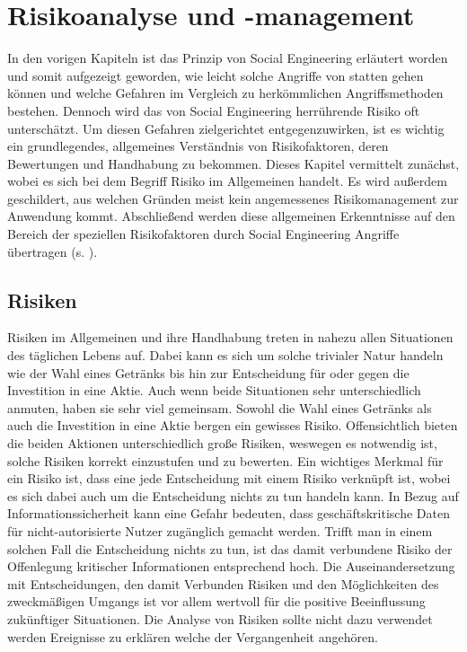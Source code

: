 \section{Risikoanalyse und -management}\label{sec:risikoanalyse}
In den vorigen Kapiteln ist das Prinzip von Social Engineering erläutert worden und somit aufgezeigt
geworden, wie leicht solche Angriffe von statten gehen können und welche Gefahren im Vergleich zu
herkömmlichen Angriffsmethoden bestehen.
Dennoch wird das von Social Engineering herrührende Risiko oft unterschätzt.
Um diesen Gefahren zielgerichtet entgegenzuwirken, ist es wichtig ein grundlegendes, allgemeines
Verständnis von Risikofaktoren, deren Bewertungen und Handhabung zu bekommen.
Dieses Kapitel vermittelt zunächst, wobei es sich bei dem Begriff Risiko im Allgemeinen handelt.
Es wird außerdem geschildert, aus welchen Gründen meist kein angemessenes Risikomanagement
zur Anwendung kommt.
Abschließend werden diese allgemeinen Erkenntnisse auf den Bereich der speziellen Risikofaktoren durch
Social Engineering Angriffe übertragen (s. ).

\subsection{Risiken}\label{sec:allgemeines}
Risiken im Allgemeinen und ihre Handhabung treten in nahezu allen Situationen des täglichen Lebens
auf.
Dabei kann es sich um solche trivialer Natur handeln wie der Wahl eines Getränks bis hin
zur Entscheidung für oder gegen die Investition in eine Aktie.
Auch wenn beide Situationen sehr unterschiedlich anmuten, haben sie sehr viel gemeinsam.
Sowohl die Wahl eines Getränks als auch die Investition in eine Aktie bergen ein gewisses Risiko.
Offensichtlich bieten die beiden Aktionen unterschiedlich große Risiken, weswegen es notwendig ist,
solche Risiken korrekt einzustufen und zu bewerten.
Ein wichtiges Merkmal für ein Risiko ist, dass eine jede Entscheidung mit einem Risiko verknüpft ist,
wobei es sich dabei auch um die Entscheidung nichts zu tun handeln kann.
In Bezug auf Informationssicherheit kann eine Gefahr bedeuten, dass geschäftskritische Daten für
nicht-autorisierte Nutzer zugänglich gemacht werden.
Trifft man in einem solchen Fall die Entscheidung nichts zu tun, ist das damit verbundene Risiko der Offenlegung kritischer Informationen entsprechend hoch.
Die Auseinandersetzung mit Entscheidungen, den damit Verbunden Risiken und den Möglichkeiten des
zweckmäßigen Umgangs ist vor allem wertvoll für die positive Beeinflussung zukünftiger Situationen.
Die Analyse von Risiken sollte nicht dazu verwendet werden Ereignisse zu erklären welche der
Vergangenheit angehören.

